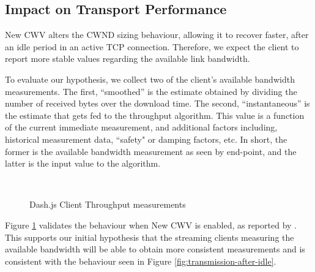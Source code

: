 \documentclass[10pt,sigconf,anonymous]{acmart}
\begin{document}
\subsection{Impact on Transport Performance} 
\label{sec:transport-impact}

New CWV alters the CWND sizing behaviour, allowing it to recover faster, after an idle period in an active TCP connection. Therefore, we expect the client to report more stable values regarding the available link bandwidth. 

To evaluate our hypothesis, we collect two of the client's available bandwidth measurements. The first, ``smoothed'' is the estimate obtained by dividing the number of received bytes over the download time. The second, ``instantaneous'' is the estimate that gets fed to the throughput algorithm. This value is a function of the current immediate measurement, and additional factors including, historical measurement data, ``safety" or damping factors, etc. In short, the former is the available bandwidth measurement as seen by end-point, and the latter is the input value to the algorithm.

\begin{figure}[t!]
  \centering
  \\
  \caption{Dash.js Client Throughput measurements}
  \label{fig:throughput-clients}
\end{figure}

Figure \ref{fig:throughput-clients} validates the behaviour when New CWV is enabled, as reported by \cite{Nazir-2014-performance-evaluation-congestion-window-validation-dash-newcwv}. This supports our initial hypothesis that the streaming clients measuring the available bandwidth will be able to obtain more consistent measurements and is consistent with the behaviour seen in Figure \ref{fig:transmission-after-idle}.
\end{document}
